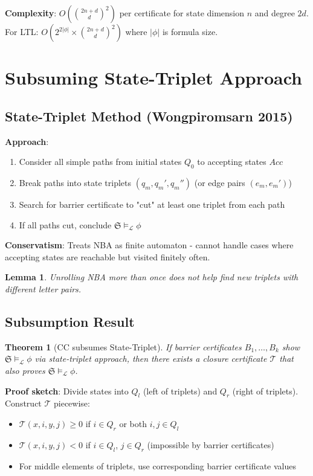 \documentclass{article}
\newtheorem{lemma}{Lemma}
\newtheorem{theorem}{Theorem}
\begin{document}
\textbf{Complexity}: $O\left(\binom{2n+d}{d}^2\right)$ per certificate for state dimension $n$ and degree $2d$. For LTL: $O\left(2^{2|\phi|} \times \binom{2n+d}{d}^2\right)$ where $|\phi|$ is formula size.

\section{Subsuming State-Triplet Approach}

\subsection{State-Triplet Method (Wongpiromsarn 2015)}

\textbf{Approach}:
\begin{enumerate}
    \item Consider all simple paths from initial states $Q_0$ to accepting states $Acc$
    \item Break paths into state triplets $(q_m, q_m', q_m'')$ (or edge pairs $(e_m, e_m')$)
    \item Search for barrier certificate to "cut" at least one triplet from each path
    \item If all paths cut, conclude $\mathfrak{S} \models_{\mathcal{L}} \phi$
\end{enumerate}

\textbf{Conservatism}: Treats NBA as finite automaton - cannot handle cases where accepting states are reachable but visited finitely often.

\begin{lemma}
Unrolling NBA more than once does not help find new triplets with different letter pairs.
\end{lemma}

\subsection{Subsumption Result}

\begin{theorem}[CC subsumes State-Triplet]
If barrier certificates $B_1, \ldots, B_k$ show $\mathfrak{S} \models_{\mathcal{L}} \phi$ via state-triplet approach, then there exists a closure certificate $\mathcal{T}$ that also proves $\mathfrak{S} \models_{\mathcal{L}} \phi$.
\end{theorem}

\textbf{Proof sketch}: Divide states into $Q_l$ (left of triplets) and $Q_r$ (right of triplets). Construct $\mathcal{T}$ piecewise:
\begin{itemize}
    \item $\mathcal{T}(x, i, y, j) \geq 0$ if $i \in Q_r$ or both $i, j \in Q_l$
    \item $\mathcal{T}(x, i, y, j) < 0$ if $i \in Q_l$, $j \in Q_r$ (impossible by barrier certificates)
    \item For middle elements of triplets, use corresponding barrier certificate values
\end{itemize}
\end{document}
